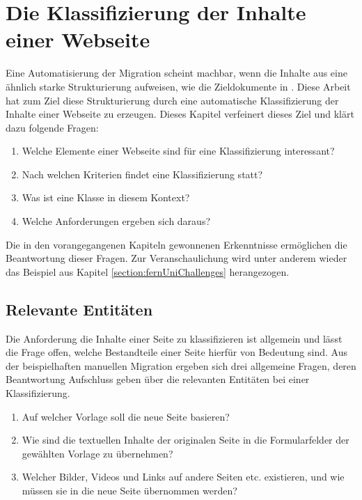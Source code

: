 \section{Die Klassifizierung der Inhalte einer Webseite}
    \label{section:WebpageClassification}
    Eine Automatisierung der Migration scheint machbar,
    wenn die Inhalte aus {\wordpress} eine ähnlich starke Strukturierung aufweisen,
    wie die Zieldokumente in {\imperia}.
    Diese Arbeit hat zum Ziel diese Strukturierung
    durch eine automatische Klassifizierung der Inhalte einer Webseite zu erzeugen.
    Dieses Kapitel verfeinert dieses Ziel und klärt dazu folgende Fragen:

    \begin{enumerate}
        \item Welche Elemente einer Webseite sind für eine Klassifizierung interessant?
        \item Nach welchen Kriterien findet eine Klassifizierung statt?
        \item Was ist eine Klasse in diesem Kontext?
        \item Welche Anforderungen ergeben sich daraus?
    \end{enumerate}

    Die in den vorangegangenen Kapiteln gewonnenen Erkenntnisse ermöglichen
    die Beantwortung dieser Fragen.
    Zur Veranschaulichung wird unter anderem wieder das Beispiel aus Kapitel
    \ref{section:fernUniChallenges} herangezogen.

    \subsection{Relevante Entitäten}
        \label{section:classificationEntities}
        Die Anforderung die Inhalte einer Seite zu klassifizieren
        ist allgemein und lässt die Frage offen,
        welche Bestandteile einer Seite hierfür von Bedeutung sind.
        Aus der beispielhaften manuellen Migration
        ergeben sich drei allgemeine Fragen,
        deren Beantwortung Aufschluss geben über die relevanten Entitäten
        bei einer Klassifizierung.

        \begin{enumerate}
            \item   Auf welcher Vorlage soll die neue Seite basieren?
            \item   Wie sind die textuellen Inhalte der originalen Seite
                    in die Formularfelder der gewählten Vorlage zu übernehmen?
            \item   Welcher Bilder, Videos und Links auf andere Seiten etc. existieren,
                    und wie müssen sie in die neue Seite übernommen werden?
        \end{enumerate}


